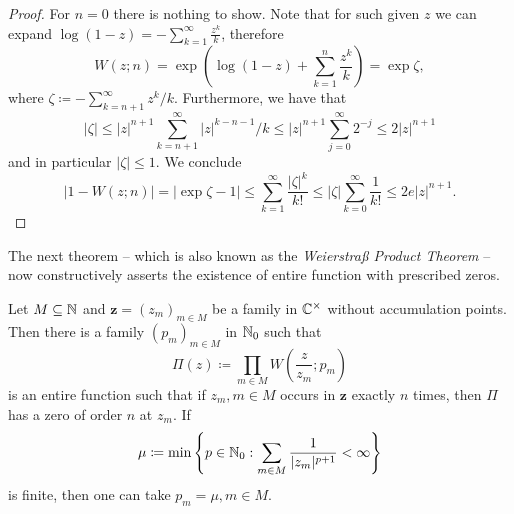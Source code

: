 \begin{proof}
    For $n = 0$ there is nothing to show. Note that for such given $z$ we can expand $\log (1 - z) = - \sum_{k=1}^\infty \frac{z^k}{k}$, therefore
    \begin{equation*}
        W(z; n) = \exp \left( \log(1-z) + \sum_{k=1}^n \frac{z^k}{k} \right) = \exp \zeta,
    \end{equation*}
    where $\zeta \coloneqq - \sum_{k=n+1}^\infty z^k / k$. Furthermore, we have that
    \begin{equation*}
        \vert \zeta \vert \leq \vert z \vert^{n+1} \sum_{k=n+1}^\infty \vert z \vert^{k-n-1} / k \leq \vert z \vert^{n+1} \sum_{j=0}^\infty 2^{-j} \leq 2 \vert z \vert^{n+1}
    \end{equation*}
    and in particular $\vert \zeta \vert \leq 1$. We conclude
    \begin{equation*}
        \vert 1 - W(z; n) \vert = \vert \exp \zeta - 1 \vert \leq \sum_{k=1}^\infty \frac{\vert \zeta \vert^k}{k!} \leq \vert \zeta \vert \sum_{k=0}^\infty \frac{1}{k!} \leq 2 e \vert z \vert^{n+1}.
    \end{equation*}
\end{proof}

The next theorem -- which is also known as the \emph{Weierstraß Product Theorem} -- now constructively asserts the existence of entire function with prescribed zeros.

\begin{theorem} \label{thm:function-with-prescribed-zeros}
    Let $M \subseteq \mathbb{N}$ and $\mathbf{z} = (z_m)_{m \in M}$ be a family in $\mathbb{C}^\times$ without accumulation points. Then there is a family $(p_m)_{m \in M}$ in $\mathbb{N}_0$ such that
    \begin{equation}
        \Pi(z) \coloneqq \prod_{m \in M} W\left(\frac{z}{z_m}; p_m\right)
    \end{equation}
    is an entire function such that if $z_m, m \in M$ occurs in $\mathbf{z}$ exactly $n$ times, then $\Pi$ has a zero of order $n$ at $z_m$. If
    \begin{equation}
        \mu \coloneqq \min \left\{ p \in \mathbb{N}_0 : \sum_{m \in M} \frac{1}{\vert z_m \vert^{p+1}} < \infty \right\}
    \end{equation}
    is finite, then one can take $p_m = \mu, m \in M$.
\end{theorem}

